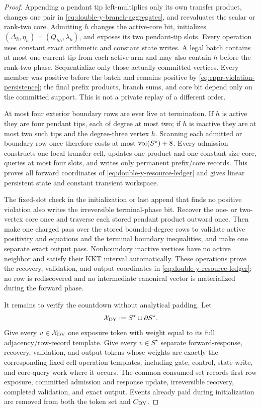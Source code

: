 \begin{proof}
Appending a pendant tip left-multiplies only its own transfer product, changes
one pair in \eqref{eq:double-y-branch-aggregates}, and reevaluates the scalar or
rank-two core.  Admitting $h$ changes the active-core bit, initializes
$(\Delta_h,\eta_h)=(Q_{hh},\lambda_h)$, and exposes its two pendant-tip slots.
Every operation uses constant exact arithmetic and constant state writes.  A
legal batch contains at most one current tip from each active arm and may also
contain $h$ before the rank-two phase.  Sequentialize only those actually
committed vertices.  Every member was positive before the batch and remains
positive by \eqref{eq:rppr-violation-persistence}; the final prefix products,
branch sums, and core bit depend only on the committed support.  This is not a
private replay of a different order.

At most four exterior boundary rows are ever live at termination.  If $h$ is
active they are four pendant tips, each of degree at most two; if $h$ is
inactive they are at most two such tips and the degree-three vertex $h$.
Scanning each admitted or boundary row once therefore costs at most
$\operatorname{vol}(S^\star)+8$.  Every admission constructs one local transfer cell,
updates one product and one constant-size core, queries at most four slots, and
writes only permanent prefix/core records.  This proves all forward coordinates
of \eqref{eq:double-y-resource-ledger} and gives linear persistent state and
constant transient workspace.

The fixed-slot check in the initialization or last append that finds no
positive violation also writes the irreversible terminal-phase bit.  Recover
the one- or two-vertex core once and traverse each stored pendant product
outward once.  Then make one charged pass over the stored bounded-degree rows
to validate active positivity and equations and the terminal boundary
inequalities, and make one separate exact output pass.  Nonboundary inactive
vertices have no active neighbor and satisfy their KKT interval automatically.
These operations prove the recovery, validation, and output coordinates in
\eqref{eq:double-y-resource-ledger}; no row is rediscovered and no intermediate
canonical vector is materialized during the forward phase.

It remains to verify the countdown without analytical padding.  Let
\begin{equation*}
 \mathcal X_{\rm DY}:=S^\star\cup\partial S^\star.
\end{equation*}
Give every $v\in\mathcal X_{\rm DY}$ one exposure token with weight equal to
its full adjacency/row-record template.  Give every $v\in S^\star$ separate
forward-response, recovery, validation, and output tokens whose weights are
exactly the corresponding fixed cell-operation templates, including gate,
control, state-write, and core-query work where it occurs.  The common consumed
set records first row exposure, committed admission and response update,
irreversible recovery, completed validation, and exact output.  Events already
paid during initialization are removed from both the token set and
$C_{\rm DY}$.


\end{proof}
